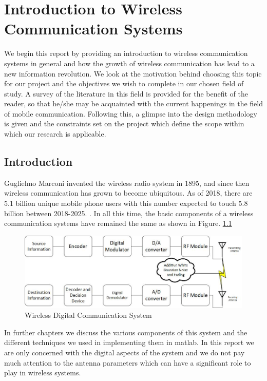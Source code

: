 \chapter{Introduction to Wireless Communication Systems}
We begin this report by providing an introduction to wireless communication systems in general and how the growth of wireless communication has lead to a new information revolution. We look at the motivation behind choosing this topic for our project and the objectives we wish to complete in our chosen field of study. A survey of the literature in this field is provided for the benefit of the reader, so that he/she may be acquainted with the current happenings in the field of mobile communication. Following this, a glimpse into the design methodology is given and the constraints set on the project which define the scope within which our research is applicable.    

\section[Introduction]{\textbf{Introduction}}
Guglielmo Marconi invented the wireless radio system in 1895, and since then wireless communication has grown to become ubiquitous. As of 2018, there are 5.1 billion unique mobile phone users with this number expected to touch 5.8 billion between 2018-2025. \textcite{George2017}.
In all this time, the basic components of a wireless communication systems have remained the same as shown in Figure. 
\ref{fig:wireless block diagram}
\begin{figure}[htb]
\centering
\includegraphics[scale=0.8]{Chapter 1/Figures/Wireless Communication System Block Diagram}
\caption{Wireless Digital Communication System}
\label{fig:wireless block diagram}
\end{figure}
 
In further chapters we discuss the various components of this system and the different techniques we used in implementing them in \gls{matlab}. In this report we are only concerned with the digital aspects of the system and we do not pay much attention to the antenna parameters which can have a significant role to play in wireless systems. 


